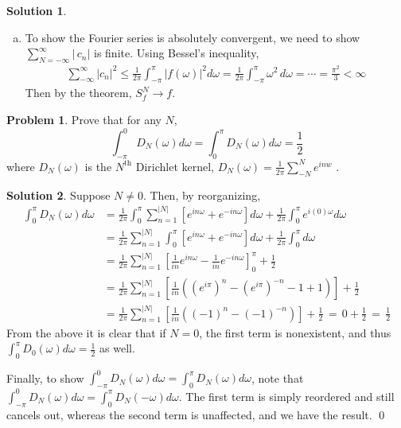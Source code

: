 \documentclass[10pt]{article}
\theoremstyle{plain}
\theoremstyle{definition}
\newtheorem{prob}{Problem}
\newtheorem*{soln*}{Solution}
\numberwithin{equation}{section}
\begin{document}
\begin{soln*}
\begin{enumerate}[(a)]
        \item
            To show the Fourier series is absolutely convergent, we need to show
            $\displaystyle \sum_{N=-\infty}^\infty \left|\,{c_n} \right|$ is finite. 
            Using Bessel's inequality,
            \begin{align*}
                \sum_{-\infty}^{\infty}|c_n|^2
                    \leq \frac{1}{2\pi} \int_{-\pi}^{\pi} | f(\omega) |^2 d\omega
                    =\frac{1}{2\pi} \int_{-\pi}^{\pi} \omega^2 \,d\omega = \cdots = \frac{\pi^2}{3}
                    < \infty
                \end{align*}
            Then by the theorem, $S_f^N \rightarrow f$.
    \end{enumerate}
\end{soln*}

\hrulefill
\newpage
\begin{prob}
    Prove that for any $N$,
    \[
            \int_{-\pi}^0  D_N(\omega) d\omega
        =   \int_{0}^{\pi}  D_N(\omega) d\omega = \frac{1}{2}
    \]
    where $D_N(\omega)$ is the $N^{\text{th}}$ Dirichlet kernel,
    $\displaystyle D_N(\omega) = \frac{1}{2\pi}\sum_{-N}^N e^{inw}$\,\,.
\end{prob}
\begin{soln*}
    Suppose $N\neq 0$. Then, by reorganizing,
    \begin{align*}
        \int_0^\pi D_N(\omega)d\omega &=
        \frac{1}{2\pi} \int_0^\pi \sum_{n=1}^{|N|}\left[
        e^{in\omega} + e^{-in\omega}\right] d\omega + \frac{1}{2\pi}\int_0^\pi e^{i(0)\omega} d\omega \\
        &= \frac{1}{2\pi} \sum_{n=1}^{|N|}\int_0^\pi \left[
        e^{in\omega} + e^{-in\omega}\right] d\omega + \frac{1}{2\pi}\int_0^\pi d\omega \\
        &= \frac{1}{2\pi} \sum_{n=1}^{|N|}
            \left[ \frac{1}{in} e^{in\omega} -\frac{1}{in} e^{-in\omega}\right]_0^\pi
            + \frac{1}{2} \\ 
        &= \frac{1}{2\pi} \sum_{n=1}^{|N|}
            \left[ \frac{1}{in}\left(
            \left(e^{i\pi}\right)^n - \left(e^{i\pi}\right)^{-n} - 1 + 1
        \right)\right] + \frac{1}{2}\\
        &= \frac{1}{2\pi} \sum_{n=1}^{|N|}
        \left[ \frac{1}{in}\left( (-1)^n - (-1)^{-n}\right)\right] + \frac{1}{2} 
        \,=\, 0 + \frac{1}{2} \,=\, \frac{1}{2}
    \end{align*}
    From the above it is clear that if $N=0$, the first term is nonexistent, and thus
    $\int_0^\pi D_0(\omega) d\omega = \frac{1}{2}$ as well.

    Finally, to show $\int_{-\pi}^0  D_N(\omega) d\omega =   \int_{0}^{\pi}  D_N(\omega) d\omega$,
    note that $\int_{-\pi}^{0} D_N(\omega) d\omega = \int_0^\pi D_N(-\omega) d\omega$.
    The first term is simply reordered and still cancels out, whereas the second term is unaffected,
    and we have the result.
    \qed
\end{soln*}
\end{document}
